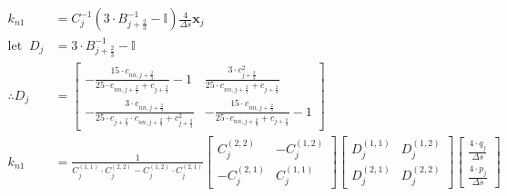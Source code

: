 \documentclass{article}
\begin{document}
\begin{align*}
	k_{n1}               & = C_j^{-1}\left(3\cdot B_{j+\frac{2}{3}}^{-1} - \mathbb{I}\right)\frac{4}{\Delta s}\bm{x}_j                                                                                                                                                                                                                                                                                                                                                                                                                                                                                                                                                                                        \\
	\mathrm{let\;\;} D_j & = 3\cdot B_{j+\frac{2}{3}}^{-1} - \mathbb{I}                                                                                                                                                                                                                                                                                                                                                                                                                                                                                                                                                                                                                                       \\
	\therefore D_j       & = \begin{bmatrix} -\frac{15\cdot c_{nn, j+\frac{2}{3}}}{25\cdot c_{nn, j+\frac{2}{3}} + c_{j+\frac{2}{3}}} - 1 & \frac{3\cdot c^2_{j+\frac{2}{3}}}{25\cdot c_{nn, j+\frac{2}{3}} + c_{j+\frac{2}{3}}}  \\ -\frac{3\cdot c_{nn, j+\frac{2}{3}}}{25\cdot c_{j+\frac{2}{3}}\cdot c_{nn, j+\frac{2}{3}} + c_{j+\frac{2}{3}}^2} & -\frac{15\cdot c_{nn, j+\frac{2}{3}}}{25\cdot c_{nn, j+\frac{2}{3}} + c_{j+\frac{2}{3}}} - 1 \end{bmatrix}                                                                                                \\
	k_{n1}               & = \frac{1}{C^{(1, 1)}_{j}\cdot C^{(2, 2)}_{j} - C^{(1, 2)}_{j}\cdot C^{(2, 1)}_{j}}\begin{bmatrix} C^{(2, 2)}_{j} & -C^{(1, 2)}_{j} \\ -C^{(2, 1)}_{j} & C^{(1, 1)}_{j} \end{bmatrix}\begin{bmatrix} D^{(1, 1)}_j & D^{(1, 2)}_j \\ D^{(2, 1)}_j & D^{(2, 2)}_j \end{bmatrix} \begin{bmatrix} \frac{4\cdot q_j}{\Delta s} \\ \frac{4\cdot p_j}{\Delta s} \end{bmatrix}                                                                                                                                                                                                                                                                                                             \\

\end{align*}
\end{document}
